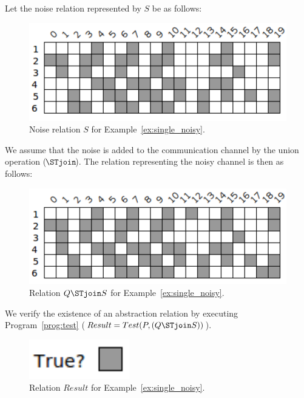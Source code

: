 \begin{example}
	Let the noise relation represented by $S$ be as follows: \newline

	\begin{figure}[ht]
		\centering
		\includegraphics[scale=0.65]{Figures/PDF/Relview/NoiseQ.pdf}
		\caption{Noise relation $S$ for Example~\ref{ex:single_noisy}.}
		\label{fig:single_noisy_s}
		\end{figure}	
		
	\newpage
	We assume that the noise is added to the communication channel by the union operation ( $\!\!\!\STjoin\!\!\!$ ). The relation representing the noisy channel is then as follows:
	
	\begin{figure}[ht]
		\centering
		\includegraphics[scale=0.65]{Figures/PDF/Relview/QNoiseQ.pdf}
		\caption{Relation $Q \STjoin S$ for Example~\ref{ex:single_noisy}.}
		\label{fig:single_noisy_qs}
	\end{figure}

	We verify the existence of an abstraction relation by executing Program~\ref{prog:test} ($Result = Test(P, (Q \STjoin S))$). \newline

	\begin{figure}[ht]
		\centering
		\includegraphics[scale=0.65]{Figures/PDF/Relview/True.pdf}
		\caption{Relation $Result$ for Example~\ref{ex:single_noisy}.}
		\label{fig:single_noisy_result}
	\end{figure}


\end{example}

